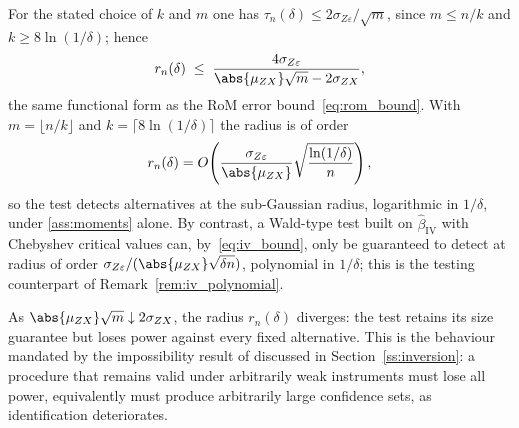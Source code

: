 \begin{remark}
\label{rem:radius_rate}
For the stated choice of $k$ and $m$ one has $\tau_n(\delta) \le 2\sigma_{Z\varepsilon}/\sqrt{m}$, since $m \le n/k$ and $k \ge 8\ln(1/\delta)$; hence
\[
  r_n(\delta) \;\le\; \frac{4\sigma_{Z\varepsilon}}{\abs{\mu_{ZX}}\sqrt{m} - 2\sigma_{ZX}},
\]
the same functional form as the RoM error bound~\eqref{eq:rom_bound}. With $m = \lfloor n/k\rfloor$ and $k = \lceil 8\ln(1/\delta)\rceil$ the radius is of order
\[
  r_n(\delta) = O\!\left(\frac{\sigma_{Z\varepsilon}}{\abs{\mu_{ZX}}}\sqrt{\frac{\ln(1/\delta)}{n}}\right),
\]
so the test detects alternatives at the sub-Gaussian radius, logarithmic in $1/\delta$, under \ref{ass:moments} alone. By contrast, a Wald-type test built on $\hat{\beta}_{\mathrm{IV}}$ with Chebyshev critical values can, by~\eqref{eq:iv_bound}, only be guaranteed to detect at radius of order $\sigma_{Z\varepsilon}/(\abs{\mu_{ZX}}\sqrt{\delta n})$, polynomial in $1/\delta$; this is the testing counterpart of Remark~\ref{rem:iv_polynomial}.
\end{remark}

\begin{remark}
\label{rem:power_weak}
As $\abs{\mu_{ZX}}\sqrt{m} \downarrow 2\sigma_{ZX}$, the radius $r_n(\delta)$ diverges: the test retains its size guarantee but loses power against every fixed alternative. This is the behaviour mandated by the impossibility result of \citet{dufour1997some} discussed in Section~\ref{ss:inversion}: a procedure that remains valid under arbitrarily weak instruments must lose all power, equivalently must produce arbitrarily large confidence sets, as identification deteriorates.
\end{remark}

